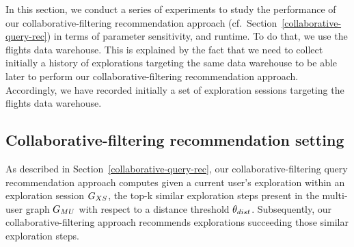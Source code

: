 \label{subsec:runtimeCollab}


In this section, we conduct a series of experiments to study the performance of our collaborative-filtering recommendation approach (cf.~Section~\ref{collaborative-query-rec}) in terms of parameter sensitivity, and runtime.
To do that, we use the flights data warehouse. %
This is explained by the fact that we need to collect initially a history of explorations targeting the same data warehouse to be able later to perform our collaborative-filtering recommendation approach. 
Accordingly, we have recorded initially a set of exploration sessions targeting the flights data warehouse. 







 \subsection{Collaborative-filtering recommendation setting}   
As described in Section~\ref{collaborative-query-rec}, our collaborative-filtering query recommendation approach computes given a current user's exploration within an exploration session $G_{XS}$, the top-k similar exploration steps present in the multi-user graph $G_{MU}$ with respect to a distance threshold  $\theta_{dist}$.
Subsequently, our collaborative-filtering approach recommends explorations succeeding those similar exploration steps.


